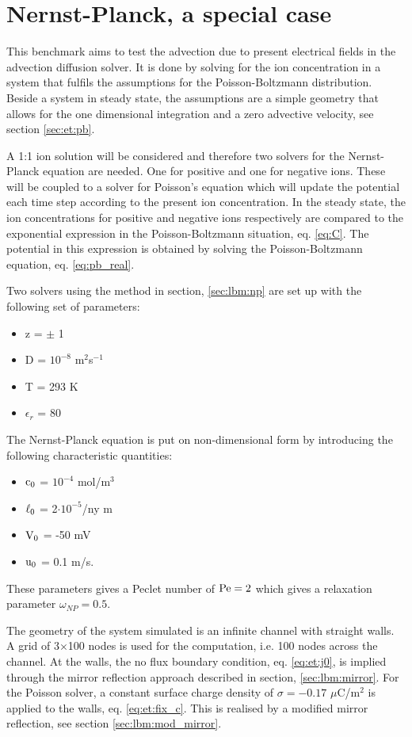 \section{Nernst-Planck, a special case}
This benchmark aims to test the advection due to present electrical
fields in the advection diffusion solver. It is done by solving for
the ion concentration in a system that fulfils the assumptions for the
Poisson-Boltzmann distribution. Beside a system in steady state, the
assumptions are a simple geometry that allows for the one dimensional
integration and a zero advective velocity, see section
\ref{sec:et:pb}. 

A 1:1 ion solution will be considered and therefore two solvers for
the Nernst-Planck equation are needed. One for positive and one for
negative ions. These will be coupled to a solver for Poisson's
equation which will update the potential each time step according to
the present ion concentration. In the steady state, the ion
concentrations for positive and negative ions respectively are
compared to the exponential expression in the Poisson-Boltzmann
situation, eq. \eqref{eq:C}. The potential in this expression is
obtained by solving the Poisson-Boltzmann equation,
eq. \eqref{eq:pb_real}.


Two solvers using the method in section, \ref{sec:lbm:np} are set up
with the following set of parameters:

\begin{itemize}
\item[] z = $\pm$ 1
\item[] D = $10^{-8}$ m$^2$s$^{-1}$
\item[] T = 293 K
\item[] $\epsilon_r$ = 80
\end{itemize}
The Nernst-Planck equation is put on non-dimensional form by
introducing the following characteristic quantities:

\begin{itemize}
\item[] $\mathrm{c_0}$ = $10^{-4}$ mol/m$^3$
\item[] $\mathrm{\ell_0}$ = 2$\cdot10^{-5}$/ny m
\item[] $\mathrm{V_0}$ = -50 mV
\item[] $\mathrm{u_0}$ = 0.1 m/s.
\end{itemize}
These parameters gives a Peclet number of $\mathrm{Pe} = 2$ which gives a
relaxation parameter $\omega_{NP} = 0.5$.

The geometry of the system simulated is an infinite channel with
straight walls. A grid of 3$\times$100 nodes is used for the
computation, i.e. 100 nodes across the channel. At the walls, the no
flux boundary condition, eq. \eqref{eq:et:j0}, is implied through the
mirror reflection approach described in section,
\ref{sec:lbm:mirror}. For the Poisson solver, a constant surface
charge density of $\sigma = -0.17$ $\mu$C/m$^2$ is applied to the
walls, eq. \eqref{eq:et:fix_c}. This is realised by a modified mirror
reflection, see section \ref{sec:lbm:mod_mirror}.

